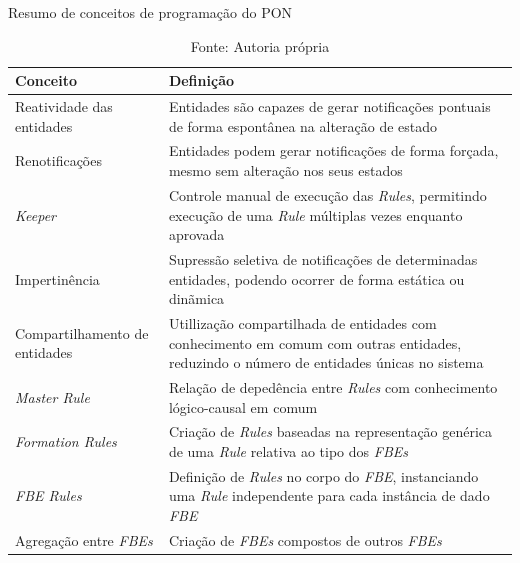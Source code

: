 \begin{table}[!htb]
\centering
\caption{Resumo de conceitos de programação do PON}
\begin{tabularx}{\textwidth}{l|X}
Conceito                              & Definição                                                                                                                                  \\ \hline\hline
Reatividade das entidades             & Entidades são capazes de gerar notificações pontuais de forma espontânea na alteração de estado                                            \\ \hline
Renotificações                        & Entidades podem gerar notificações de forma forçada, mesmo sem alteração nos seus estados                                                  \\ \hline
\textit{Keeper}                       & Controle manual de execução das \textit{Rules}, permitindo execução de uma \textit{Rule} múltiplas vezes enquanto aprovada                 \\ \hline
Impertinência                         & Supressão seletiva de notificações de determinadas entidades, podendo ocorrer de forma estática ou dinãmica                                \\ \hline
Compartilhamento de entidades         & Utillização compartilhada de entidades com conhecimento em comum com outras entidades, reduzindo o número de entidades únicas no sistema   \\ \hline
\textit{Master Rule}                  & Relação de depedência entre \textit{Rules} com conhecimento lógico-causal em comum                                                         \\ \hline
\textit{Formation Rules}              & Criação de \textit{Rules} baseadas na representação genérica de uma \textit{Rule} relativa ao tipo dos \textit{FBEs}                       \\ \hline
\textit{FBE Rules}                    & Definição de \textit{Rules} no corpo do \textit{FBE}, instanciando uma \textit{Rule} independente para cada instância de dado \textit{FBE} \\ \hline
Agregação entre \textit{FBEs}         & Criação de \textit{FBEs} compostos de outros \textit{FBEs}                                                                                 \\ \hline
\end{tabularx}
\caption*{Fonte: Autoria própria}
\label{tab:resumo_conceitos}
\end{table}

